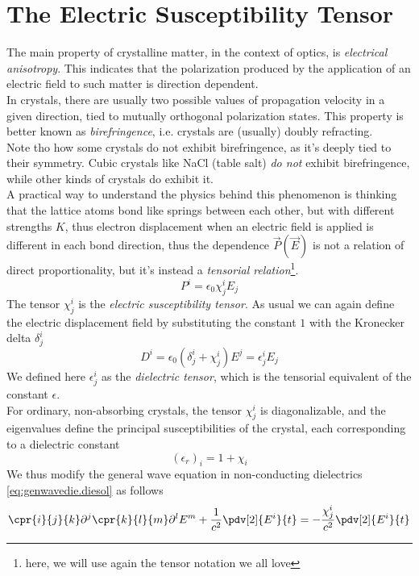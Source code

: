 \documentclass[../electromagnetism.tex]{subfiles}
\begin{document}
\section{The Electric Susceptibility Tensor}
The main property of crystalline matter, in the context of optics, is \textit{electrical anisotropy}. This indicates that the polarization produced by the application of an electric field to such matter is direction dependent.\\
In crystals, there are usually two possible values of propagation velocity in a given direction, tied to mutually orthogonal polarization states. This property is better known as \textit{birefringence}, i.e. crystals are (usually) doubly refracting.\\
Note tho how some crystals do not exhibit birefringence, as it's deeply tied to their symmetry. Cubic crystals like NaCl (table salt) \textit{do not} exhibit birefringence, while other kinds of crystals do exhibit it.\\
A practical way to understand the physics behind this phenomenon is thinking that the lattice atoms bond like springs between each other, but with different strengths $K$, thus electron displacement when an electric field is applied is different in each bond direction, thus the dependence $\vec{P}(\vec{E})$ is not a relation of direct proportionality, but it's instead a \textit{tensorial relation}\footnote{here, we will use again the tensor notation we all love}.\\
\begin{equation}
	P^i=\epsilon_0\chi^i_jE_j
	\label{eq:perel.cry}
\end{equation}
The tensor $\chi^i_j$ is the \textit{electric susceptibility tensor}. As usual we can again define the electric displacement field by substituting the constant $1$ with the Kronecker delta $\delta^i_j$
\begin{equation}
	D^i=\epsilon_0\left( \delta^i_j+\chi^i_j \right)E^j=\epsilon^i_jE_j
	\label{eq:dietens.cry}
\end{equation}
We defined here $\epsilon^i_j$ as the \textit{dielectric tensor}, which is the tensorial equivalent of the constant $\epsilon$.\\
For ordinary, non-absorbing crystals, the tensor $\chi^i_j$ is diagonalizable, and the eigenvalues define the principal susceptibilities of the crystal, each corresponding to a dielectric constant
\begin{equation}
	\left(\epsilon_r\right)_i=1+\chi_i
	\label{eq:dieconst.cry}
\end{equation}
We thus modify the general wave equation in non-conducting dielectrics \eqref{eq:genwavedie.diesol} as follows
\begin{equation}
	\cpr{i}{j}{k}\partial^j\cpr{k}{l}{m}\partial^lE^m+\frac{1}{c^2}\pdv[2]{E^i}{t}=-\frac{\chi^i_j}{c^2}\pdv[2]{E^i}{t}
	\label{eq:modgeneq.cry}
\end{equation}
\end{document}
